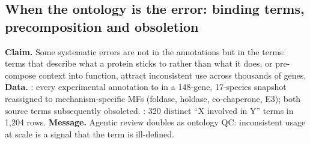 \subsection{When the ontology is the error: binding terms, precomposition and obsoletion}\label{sec:dd-ontology}
\textbf{Claim.} Some systematic errors are not in the annotations but in the terms: terms that
describe what a protein sticks to rather than what it does, or pre-compose context into
function, attract inconsistent use across thousands of genes.
\textbf{Data.} : every experimental annotation to
 in a 148-gene, 17-species snapshot reassigned to
mechanism-specific MFs (foldase, holdase, co-chaperone, E3); both source terms subsequently
obsoleted. : 320 distinct ``X involved in Y'' terms in 1,204
rows. 
\textbf{Message.} Agentic review doubles as ontology QC: inconsistent usage at scale is a signal
that the term is ill-defined.
